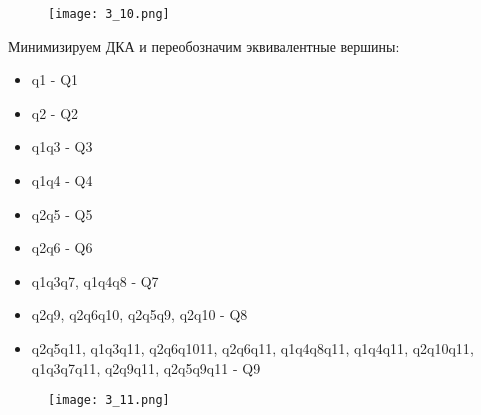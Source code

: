 \documentclass[12pt, a4paper]{article}
\begin{document}
\begin{enumerate}
    \begin{figure}[H]
        \centering
        \texttt{[image: 3\_10.png]}
    \end{figure}

Минимизируем ДКА и переобозначим эквивалентные вершины:
\begin{itemize}
    \item q1 - Q1
    \item q2 - Q2
    \item {q1q3} - Q3
    \item {q1q4} - Q4
    \item {q2q5} - Q5
    \item {q2q6} - Q6
    \item {q1q3q7}, {q1q4q8} - Q7
    \item {q2q9}, {q2q6q10}, {q2q5q9}, {q2q10} - Q8
    \item {q2q5q11}, {q1q3q11}, {q2q6q1011}, {q2q6q11}, {q1q4q8q11}, {q1q4q11}, {q2q10q11}, {q1q3q7q11}, {q2q9q11}, {q2q5q9q11} - Q9
\end{itemize}

\begin{comment}
digraph {
    rankdir="LR"
    "" [shape=point]
    Q1 [shape=circle]
    Q2 [shape=circle]
    Q3 [shape=circle]
    Q4 [shape=circle]
    Q5 [shape=circle]
    Q6 [shape=circle]
    Q7 [shape=circle]
    Q8 [shape=circle]
    Q9 [shape=doublecircle]

    "" -> Q1
    Q1 -> Q2 [label="a, b"]
    Q2 -> Q3 [label="a"]
    Q2 -> Q4 [label="b"]
    Q3 -> Q8 [label="a"]
    Q3 -> Q5 [label="b"]
    Q4 -> Q6 [label="a"]
    Q4 -> Q8 [label="b"]
    Q5 -> Q7 [label="a"]
    Q5 -> Q4 [label="b"]
    Q6 -> Q3 [label="a"]
    Q6 -> Q7 [label="b"]
    Q7 -> Q8 [label="a,b"]
    Q8 -> Q9 [label="a,b"]
    Q9 -> Q9 [label="a,b"]
}
\end{comment}

    \begin{figure}[H]
        \centering
        \texttt{[image: 3\_11.png]}
    \end{figure}

\end{enumerate}

\end{document}
